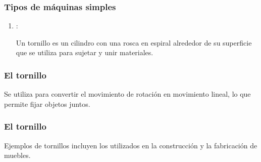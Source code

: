 \documentclass[14pt]{beamer}
\begin{document}
\begin{frame}
\frametitle{Tipos de máquinas simples}
\begin{enumerate}[<+->]
\conti
\item {}:

Un tornillo es un cilindro con una rosca en espiral alrededor de su superficie que se utiliza para sujetar y unir materiales.
\end{enumerate}
\end{frame}
\begin{frame}
\frametitle{El tornillo}
Se utiliza para convertir el movimiento de rotación en movimiento lineal, lo que permite fijar objetos juntos.
\end{frame}
\begin{frame}
\frametitle{El tornillo}
Ejemplos de tornillos incluyen los utilizados en la construcción y la fabricación de muebles.
\end{frame}
\end{document}
